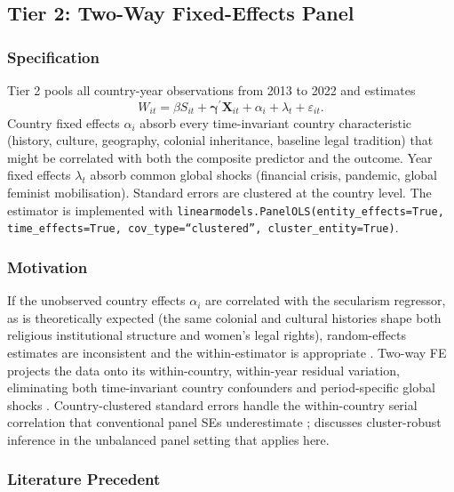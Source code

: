 \documentclass[12pt,a4paper]{article}
\begin{document}
\subsection{Tier 2: Two-Way Fixed-Effects Panel}

\subsubsection{Specification}

Tier 2 pools all country-year observations from 2013 to 2022 and estimates
\begin{equation}
W_{it} = \beta S_{it} + \boldsymbol{\gamma}^{\prime} \mathbf{X}_{it} + \alpha_i + \lambda_t + \varepsilon_{it}.
\end{equation}
Country fixed effects $\alpha_i$ absorb every time-invariant country characteristic (history, culture, geography, colonial inheritance, baseline legal tradition) that might be correlated with both the composite predictor and the outcome. Year fixed effects $\lambda_t$ absorb common global shocks (financial crisis, pandemic, global feminist mobilisation). Standard errors are clustered at the country level. The estimator is implemented with \texttt{linearmodels.PanelOLS(entity\_effects=True, time\_effects=True, cov\_type=``clustered'', cluster\_entity=True)}.

\subsubsection{Motivation}

If the unobserved country effects $\alpha_i$ are correlated with the secularism regressor, as is theoretically expected (the same colonial and cultural histories shape both religious institutional structure and women's legal rights), random-effects estimates are inconsistent and the within-estimator is appropriate \citep{Hausman1978}. Two-way FE projects the data onto its within-country, within-year residual variation, eliminating both time-invariant country confounders and period-specific global shocks \citep{AngristPischke2009}. Country-clustered standard errors handle the within-country serial correlation that conventional panel SEs underestimate \citep{BertrandDufloMullainathan2004}; \citet{CameronMiller2015} discusses cluster-robust inference in the unbalanced panel setting that applies here.

\subsubsection{Literature Precedent}
\end{document}
